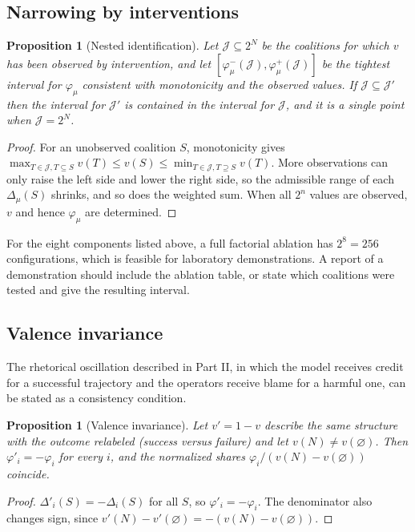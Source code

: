 \documentclass[11pt]{article}
\newtheorem{proposition}[theorem]{Proposition}
\theoremstyle{definition}
\begin{document}
\subsection{Narrowing by interventions}

\begin{proposition}[Nested identification]\label{prop:B3}
Let $\mathcal{J}\subseteq2^N$ be the coalitions for which $v$ has been observed by intervention, and let $[\varphi^-_\mu(\mathcal{J}),\varphi^+_\mu(\mathcal{J})]$ be the tightest interval for $\varphi_\mu$ consistent with monotonicity and the observed values. If $\mathcal{J}\subseteq\mathcal{J}'$ then the interval for $\mathcal{J}'$ is contained in the interval for $\mathcal{J}$, and it is a single point when $\mathcal{J}=2^N$.
\end{proposition}
\begin{proof}
For an unobserved coalition $S$, monotonicity gives $\max_{T\in\mathcal{J},T\subseteq S}v(T)\le v(S)\le\min_{T\in\mathcal{J},T\supseteq S}v(T)$. More observations can only raise the left side and lower the right side, so the admissible range of each $\Delta_\mu(S)$ shrinks, and so does the weighted sum. When all $2^n$ values are observed, $v$ and hence $\varphi_\mu$ are determined.
\end{proof}

For the eight components listed above, a full factorial ablation has $2^8=256$ configurations, which is feasible for laboratory demonstrations. A report of a demonstration should include the ablation table, or state which coalitions were tested and give the resulting interval.

\subsection{Valence invariance}

The rhetorical oscillation described in Part II, in which the model receives credit for a successful trajectory and the operators receive blame for a harmful one, can be stated as a consistency condition.

\begin{proposition}[Valence invariance]\label{prop:B4}
Let $v'=1-v$ describe the same structure with the outcome relabeled (success versus failure) and let $v(N)\ne v(\varnothing)$. Then $\varphi'_i=-\varphi_i$ for every $i$, and the normalized shares $\varphi_i/(v(N)-v(\varnothing))$ coincide.
\end{proposition}
\begin{proof}
$\Delta'_i(S)=-\Delta_i(S)$ for all $S$, so $\varphi'_i=-\varphi_i$. The denominator also changes sign, since $v'(N)-v'(\varnothing)=-(v(N)-v(\varnothing))$.
\end{proof}
\end{document}
